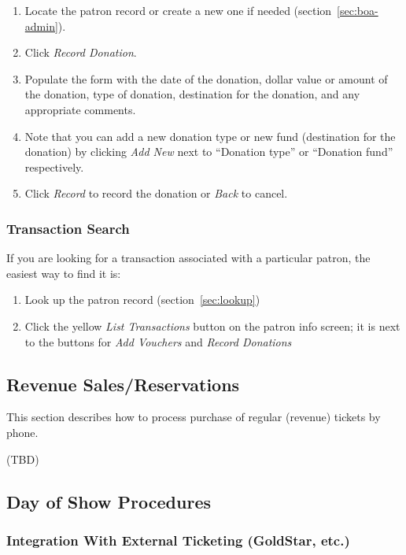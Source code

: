 \begin{enumerate}
\item  Locate the patron record or create a new one if needed
  (section~\ref{sec:boa-admin}). 
\item Click \emph{Record Donation}.
\item Populate the form with the date of the donation, dollar value or
  amount of the donation, type of donation, destination for the
  donation, and any appropriate comments.
\item Note that you can add a new donation type or new fund (destination
  for the donation) by clicking \emph{Add New} next to ``Donation type''
  or ``Donation fund'' respectively.
\item Click \emph{Record} to record the donation or \emph{Back} to
  cancel. 

\end{enumerate}

\subsubsection{Transaction Search}
\label{sec:txnsearch}

If you are looking for a transaction associated with a particular
patron, the easiest way to find it is:

\begin{enumerate}
\item Look up the patron record (section~\ref{sec:lookup})
\item Click the yellow \emph{List Transactions} button on the patron
  info screen; it is next to the buttons for \emph{Add Vouchers} and
  \emph{Record Donations}
\end{enumerate}

\subsection{Revenue Sales/Reservations}
\label{sec:advance_sales}

This section describes how to process purchase of regular (revenue)
tickets by phone.

(TBD)

\subsection{Day of Show Procedures}
\label{sec:dayofshow}

\subsubsection{Integration With External Ticketing (GoldStar, etc.)}
\label{sec:externalticketing}

